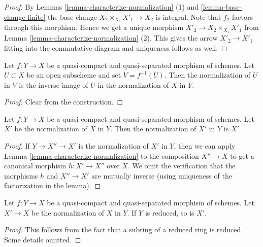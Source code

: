 \begin{proof}
By Lemmas \ref{lemma-characterize-normalization} (1)
and \ref{lemma-base-change-finite}
the base change $X_2 \times_{X_1} X'_1 \to X_2$
is integral. Note that $f_2$ factors through this morphism.
Hence we get a unique morphism
$X'_2 \to X_2 \times_{X_1} X'_1$ from
Lemma \ref{lemma-characterize-normalization} (2).
This gives the arrow $X'_2 \to X'_1$ fitting into
the commutative diagram and uniqueness follows as well.
\end{proof}

\begin{lemma}
\label{lemma-normalization-localization}
Let $f : Y \to X$ be a quasi-compact and quasi-separated morphism of schemes.
Let $U \subset X$ be an open subscheme and set $V = f^{-1}(U)$.
Then the normalization of $U$ in $V$ is the inverse image of $U$
in the normalization of $X$ in $Y$.
\end{lemma}

\begin{proof}
Clear from the construction.
\end{proof}

\begin{lemma}
\label{lemma-normalization-is-normalization}
Let $f : Y \to X$ be a quasi-compact and quasi-separated morphism of schemes.
Let $X'$ be the normalization of $X$ in $Y$. Then the normalization of
$X'$ in $Y$ is $X'$.
\end{lemma}

\begin{proof}
If $Y \to X'' \to X'$ is the normalization of $X'$ in $Y$, then
we can apply Lemma \ref{lemma-characterize-normalization}
to the composition $X'' \to X$ to get a canonical morphism
$h : X' \to X''$ over $X$. We omit the verification that the
morphisms $h$ and $X'' \to X'$ are mutually inverse (using uniqueness
of the factorization in the lemma).
\end{proof}

\begin{lemma}
\label{lemma-normalization-in-reduced}
Let $f : Y \to X$ be a quasi-compact and quasi-separated morphism of schemes.
Let $X' \to X$ be the normalization of $X$ in $Y$. If $Y$ is reduced, so
is $X'$.
\end{lemma}

\begin{proof}
This follows from the fact that a subring of a reduced ring is reduced.
Some details omitted.
\end{proof}

